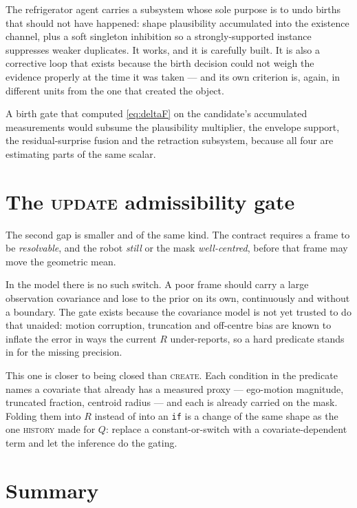 \documentclass[11pt,a4paper]{report}
\begin{document}
The refrigerator agent carries a subsystem whose sole purpose is to undo births that should not
have happened: shape plausibility accumulated into the existence channel, plus a soft singleton
inhibition so a strongly-supported instance suppresses weaker duplicates. It works, and it is
carefully built. It is also a corrective loop that exists because the birth decision could not
weigh the evidence properly at the time it was taken --- and its own criterion is, again, in
different units from the one that created the object.

A birth gate that computed \eqref{eq:deltaF} on the candidate's accumulated measurements would
subsume the plausibility multiplier, the envelope support, the residual-surprise fusion and the
retraction subsystem, because all four are estimating parts of the same scalar.

\section{The \textsc{update} admissibility gate}
\label{sec:admissibility}

The second gap is smaller and of the same kind. The contract requires a frame to be
\emph{resolvable}, and the robot \emph{still} or the mask \emph{well-centred}, before that frame
may move the geometric mean.

In the model there is no such switch. A poor frame should carry a large observation covariance and
lose to the prior on its own, continuously and without a boundary. The gate exists because the
covariance model is not yet trusted to do that unaided: motion corruption, truncation and
off-centre bias are known to inflate the error in ways the current $R$ under-reports, so a hard
predicate stands in for the missing precision.

This one is closer to being closed than \textsc{create}. Each condition in the predicate names a
covariate that already has a measured proxy --- ego-motion magnitude, truncated fraction, centroid
radius --- and each is already carried on the mask. Folding them into $R$ instead of into an
\texttt{if} is a change of the same shape as the one \textsc{history} made for $Q$: replace a
constant-or-switch with a covariate-dependent term and let the inference do the gating.

\section{Summary}
\end{document}

